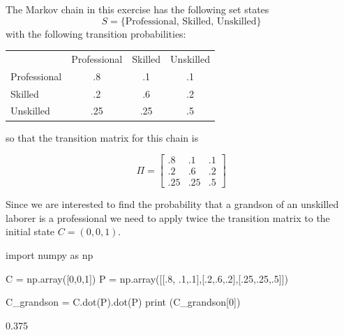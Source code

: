 \cprotEnv\begin{solution}
The Markov chain in this exercise has the following set states
\begin{equation*}
S = \{\textrm{Professional, Skilled, Unskilled}\}
\end{equation*}
with the following transition probabilities:

\begin{table}[htbp]
\centering
\begin{tabular}{l c c c}
&Professional& Skilled &Unskilled \\
Professional & .8 & .1 & .1 \\
Skilled & .2 & .6 & .2 \\
Unskilled & .25 & .25 & .5 \\
\end{tabular}
\end{table}
\noindent
so that the transition matrix for this chain is

\begin{equation*}
\Pi =
\begin{bmatrix}
.8 &.1 &.1\\
.2 &.6 &.2\\
.25 &.25 &.5
\end{bmatrix}
\end{equation*}

Since we are interested to find the probability that a grandson of an unskilled laborer is a professional we need to apply twice the transition matrix to the initial state $C=(0, 0, 1)$.
\begin{ipython}
import numpy as np

C = np.array([0,0,1])
P = np.array([[.8, .1,.1],[.2,.6,.2],[.25,.25,.5]])

C_grandson = C.dot(P).dot(P)
print (C_grandson[0])
\end{ipython}
\begin{ioutput}
0.375
\end{ioutput}
\end{solution}

